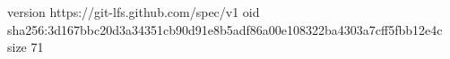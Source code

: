version https://git-lfs.github.com/spec/v1
oid sha256:3d167bbc20d3a34351cb90d91e8b5adf86a00e108322ba4303a7cff5fbb12e4c
size 71
